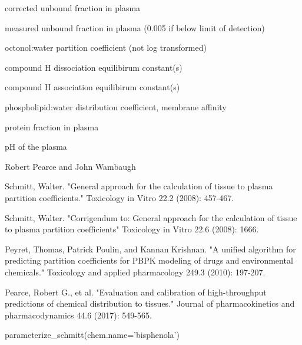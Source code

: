 \documentclass[a4paper]{book}
\begin{document}
%
\begin{Value}
\begin{ldescription}
\item[\code{Funbound.plasma}] corrected unbound fraction in plasma
\item[\code{unadjusted.Funbound.plasma}] measured unbound fraction in plasma (0.005
if below limit of detection)\item[\code{Pow}] octonol:water partition coefficient
(not log transformed)\item[\code{pKa\_Donor}] compound H dissociation equilibirum
constant(s)\item[\code{pKa\_Accept}] compound H association equilibirum
constant(s)\item[\code{MA}] phospholipid:water distribution coefficient, membrane
affinity\item[\code{Fprotein.plasma}] protein fraction in plasma
\item[\code{plasma.pH}] pH of the plasma
\end{ldescription}
\end{Value}
%
\begin{Author}\relax
Robert Pearce and John Wambaugh
\end{Author}
%
\begin{References}\relax
Schmitt, Walter. "General approach for the calculation of 
tissue to plasma partition coefficients." Toxicology in Vitro 22.2 (2008): 
457-467.

Schmitt, Walter. "Corrigendum to: General approach for the calculation of 
tissue to plasma partition coefficients" Toxicology in Vitro 22.6 (2008): 1666.

Peyret, Thomas, Patrick Poulin, and Kannan Krishnan. "A unified algorithm 
for predicting partition coefficients for PBPK modeling of drugs and 
environmental chemicals." Toxicology and applied pharmacology 249.3 (2010): 
197-207.

Pearce, Robert G., et al. "Evaluation and calibration of high-throughput 
predictions of chemical distribution to tissues." Journal of pharmacokinetics 
and pharmacodynamics 44.6 (2017): 549-565.
\end{References}
%
\begin{Examples}
\begin{ExampleCode}

parameterize_schmitt(chem.name='bisphenola')

\end{ExampleCode}
\end{Examples}
\end{document}
